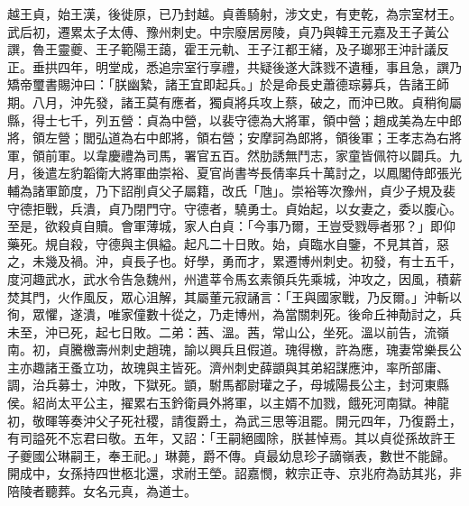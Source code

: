 \begin{pinyinscope}
 越王貞，始王漢，後徙原，已乃封越。貞善騎射，涉文史，有吏乾，為宗室材王。武后初，遷累太子太傅、豫州刺史。中宗廢居房陵，貞乃與韓王元嘉及王子黃公譔，魯王靈夔、王子範陽王藹，霍王元軌、王子江都王緒，及子瑯邪王沖計議反正。垂拱四年，明堂成，悉追宗室行享禮，共疑後遂大誅戮不遺種，事且急，譔乃矯帝璽書賜沖曰：「朕幽縶，諸王宜即起兵。」於是命長史蕭德琮募兵，告諸王師期。八月，沖先發，諸王莫有應者，獨貞將兵攻上蔡，破之，而沖已敗。貞稍徇屬縣，得士七千，列五營：貞為中營，以裴守德為大將軍，領中營；趙成美為左中郎將，領左營；閭弘道為右中郎將，領右營；安摩訶為郎將，領後軍；王孝志為右將軍，領前軍。以韋慶禮為司馬，署官五百。然肋誘無鬥志，家童皆佩符以闢兵。九月，後遣左豹韜衛大將軍曲崇裕、夏官尚書岑長倩率兵十萬討之，以鳳閣侍郎張光輔為諸軍節度，乃下詔削貞父子屬籍，改氏「虺」。崇裕等次豫州，貞少子規及裴守德拒戰，兵潰，貞乃閉門守。守德者，驍勇士。貞始起，以女妻之，委以腹心。至是，欲殺貞自贖。會軍薄城，家人白貞：「今事乃爾，王豈受戮辱者邪？」即仰藥死。規自殺，守德與主俱縊。起凡二十日敗。始，貞臨水自鑒，不見其首，惡之，未幾及禍。沖，貞長子也。好學，勇而才，累遷博州刺史。初發，有士五千，度河趣武水，武水令告急魏州，州遣莘令馬玄素領兵先乘城，沖攻之，因風，積薪焚其門，火作風反，眾心沮解，其屬董元寂誦言：「王與國家戰，乃反爾。」沖斬以徇，眾懼，遂潰，唯家僮數十從之，乃走博州，為當關刺死。後命丘神勣討之，兵未至，沖已死，起七日敗。二弟：茜、溫。茜，常山公，坐死。溫以前告，流嶺南。初，貞騰檄壽州刺史趙瑰，諭以興兵且假道。瑰得檄，許為應，瑰妻常樂長公主亦趣諸王蚤立功，故瑰與主皆死。濟州刺史薛顗與其弟紹謀應沖，率所部庸、調，治兵募士，沖敗，下獄死。顗，駙馬都尉瓘之子，母城陽長公主，封河東縣侯。紹尚太平公主，擢累右玉鈐衛員外將軍，以主婿不加戮，餓死河南獄。神龍初，敬暉等奏沖父子死社稷，請復爵土，為武三思等沮罷。開元四年，乃復爵土，有司謚死不忘君曰敬。五年，又詔：「王嗣絕國除，朕甚悼焉。其以貞從孫故許王子夔國公琳嗣王，奉王祀。」琳薨，爵不傳。貞最幼息珍子謫嶺表，數世不能歸。開成中，女孫持四世柩北還，求祔王塋。詔嘉憫，敕宗正寺、京兆府為訪其兆，非陪陵者聽葬。女名元真，為道士。




\end{pinyinscope}
